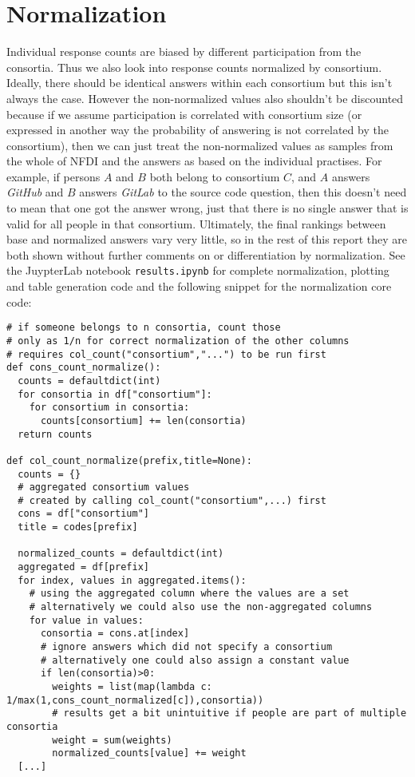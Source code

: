 \documentclass[headsepline,titlepage,twoside,12pt,toc=flat,headings=normal]{scrreprt}
\begin{document}
\newpage
\section{Normalization}
Individual response counts are biased by different participation from the consortia.
Thus we also look into response counts normalized by consortium.
Ideally, there should be identical answers within each consortium but this isn't always the case.
However the non-normalized values also shouldn't be discounted because if we assume participation is correlated with consortium size (or expressed in another way the probability of answering is not correlated by the consortium), then we can just treat the non-normalized values as samples from the whole of NFDI and the answers as based on the individual practises.
For example, if persons $A$ and $B$ both belong to consortium $C$, and $A$ answers \emph{GitHub} and $B$ answers \emph{GitLab} to the source code question, then this doesn't need to mean that one got the answer wrong, just that there is no single answer that is valid for all people in that consortium.
Ultimately, the final rankings between base and normalized answers vary very little, so in the rest of this report they are both shown without further comments on or differentiation by normalization.
See the JuypterLab notebook \texttt{results.ipynb} for complete normalization, plotting and table generation code and the following snippet for the normalization core code:
\begin{lstlisting}
# if someone belongs to n consortia, count those
# only as 1/n for correct normalization of the other columns
# requires col_count("consortium","...") to be run first
def cons_count_normalize():
  counts = defaultdict(int)
  for consortia in df["consortium"]:
    for consortium in consortia:
      counts[consortium] += len(consortia)
  return counts

def col_count_normalize(prefix,title=None):
  counts = {}
  # aggregated consortium values
  # created by calling col_count("consortium",...) first
  cons = df["consortium"]
  title = codes[prefix]
  
  normalized_counts = defaultdict(int)
  aggregated = df[prefix]
  for index, values in aggregated.items():
    # using the aggregated column where the values are a set
    # alternatively we could also use the non-aggregated columns
    for value in values:
      consortia = cons.at[index]
      # ignore answers which did not specify a consortium
      # alternatively one could also assign a constant value
      if len(consortia)>0:
        weights = list(map(lambda c: 1/max(1,cons_count_normalized[c]),consortia))
        # results get a bit unintuitive if people are part of multiple consortia
        weight = sum(weights)
        normalized_counts[value] += weight
  [...]
\end{lstlisting}
\end{document}
